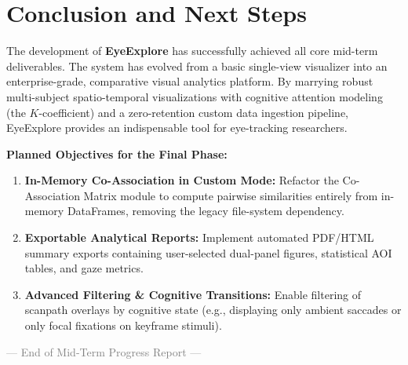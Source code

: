 \documentclass[11pt,a4paper]{article}
\begin{document}
\section{Conclusion and Next Steps}
\label{sec:conclusion}

The development of \textbf{EyeExplore} has successfully achieved all core mid-term deliverables. The system has evolved from a basic single-view visualizer into an enterprise-grade, comparative visual analytics platform. By marrying robust multi-subject spatio-temporal visualizations with cognitive attention modeling (the $K$-coefficient) and a zero-retention custom data ingestion pipeline, EyeExplore provides an indispensable tool for eye-tracking researchers.

\textbf{Planned Objectives for the Final Phase:}
\begin{enumerate}[noitemsep,topsep=2pt]
    \item \textbf{In-Memory Co-Association in Custom Mode:} Refactor the Co-Association Matrix module to compute pairwise similarities entirely from in-memory DataFrames, removing the legacy file-system dependency.
    \item \textbf{Exportable Analytical Reports:} Implement automated PDF/HTML summary exports containing user-selected dual-panel figures, statistical AOI tables, and gaze metrics.
    \item \textbf{Advanced Filtering \& Cognitive Transitions:} Enable filtering of scanpath overlays by cognitive state (e.g., displaying only ambient saccades or only focal fixations on keyframe stimuli).
\end{enumerate}

\vspace{0.5cm}
\begin{center}
    \small \textcolor{gray}{--- End of Mid-Term Progress Report ---}
\end{center}
\end{document}
